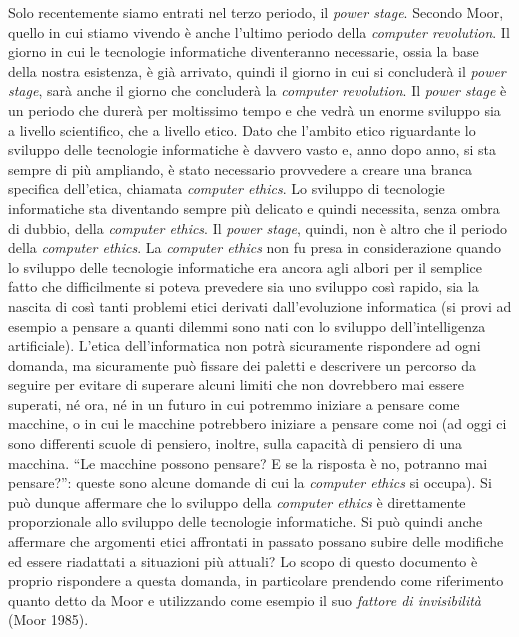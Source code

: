 Solo recentemente siamo entrati nel terzo periodo, il \textit{power stage}. Secondo Moor, quello in cui stiamo vivendo è anche l’ultimo periodo della \textit{computer revolution}. Il giorno in cui le tecnologie informatiche diventeranno necessarie, ossia la base della nostra esistenza, è già arrivato, quindi il giorno in cui si concluderà il \textit{power stage}, sarà anche il giorno che concluderà la \textit{computer revolution}.
Il \textit{power stage} è un periodo che durerà per moltissimo tempo e che vedrà un enorme sviluppo sia a livello scientifico, che a livello etico. 
Dato che l’ambito etico riguardante lo sviluppo delle tecnologie informatiche è davvero vasto e, anno dopo anno, si sta sempre di più ampliando, è stato necessario provvedere a creare una branca specifica dell’etica, chiamata \textit{computer ethics}.
Lo sviluppo di tecnologie informatiche sta diventando sempre più delicato e quindi necessita, senza ombra di dubbio, della \textit{computer ethics}.
Il \textit{power stage}, quindi, non è altro che il periodo della \textit{computer ethics}.
La \textit{computer ethics} non fu presa in considerazione quando lo sviluppo delle tecnologie informatiche era ancora agli albori per il semplice fatto che difficilmente si poteva prevedere sia uno sviluppo così rapido, sia la nascita di così tanti problemi etici derivati dall’evoluzione informatica (si provi ad esempio a pensare a quanti dilemmi sono nati con lo sviluppo dell’intelligenza artificiale).
L’etica dell’informatica non potrà sicuramente rispondere ad ogni domanda, ma sicuramente può fissare dei paletti e descrivere un percorso da seguire per evitare di superare alcuni limiti che non dovrebbero mai essere superati, né ora, né in un futuro in cui potremmo iniziare a pensare come macchine, o in cui le macchine potrebbero iniziare a pensare come noi (ad oggi ci sono differenti scuole di pensiero, inoltre, sulla capacità di pensiero di una macchina. “Le macchine possono pensare? E se la risposta è no, potranno mai pensare?”: queste sono alcune domande di cui la \textit{computer ethics} si occupa).
Si può dunque affermare che lo sviluppo della \textit{computer ethics} è direttamente proporzionale allo sviluppo delle tecnologie informatiche.
Si può quindi anche affermare che argomenti etici affrontati in passato possano subire delle modifiche ed essere riadattati a situazioni più attuali? Lo scopo di questo documento è proprio rispondere a questa domanda, in particolare prendendo come riferimento quanto detto da Moor e utilizzando come esempio il suo \textit{fattore di invisibilità} (Moor 1985).